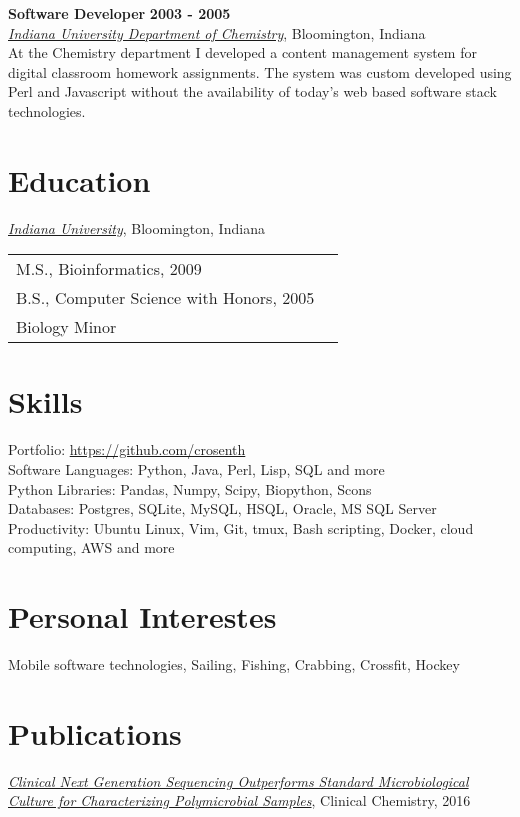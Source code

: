 \documentclass{res}
\begin{document}
\begin{resume}
\textbf{Software Developer} \hfill \textbf{2003 - 2005}\\
\href{http://chem.indiana.edu/}{\textit{Indiana University Department of Chemistry}}, Bloomington, Indiana\\
  At the Chemistry department I developed a content management system for digital classroom homework assignments.
  The system was custom developed using Perl and Javascript without the availability of today's web based 
  software stack technologies.

\section{Education}
\href{http://www.iub.edu/}{\textit{Indiana University}}, Bloomington, Indiana\\
\begin{tabular}{p{10cm} l} 
M.S., Bioinformatics, 2009\\
B.S., Computer Science with Honors, 2005\\
Biology Minor
\end{tabular}

\section{Skills}
Portfolio: \url{https://github.com/crosenth}\\
Software Languages: Python, Java, Perl, Lisp, SQL and more\\
Python Libraries: Pandas, Numpy, Scipy, Biopython, Scons\\
Databases: Postgres, SQLite, MySQL, HSQL, Oracle, MS SQL Server\\
Productivity: Ubuntu Linux, Vim, Git, tmux, Bash scripting, Docker, cloud computing, AWS and more

\section{Personal Interestes}
Mobile software technologies, Sailing, Fishing, Crabbing, Crossfit, Hockey

\section{Publications}
\renewcommand{\section}[2]{}
\begin{thebibliography}{4}
    \href{http://clinchem.aaccjnls.org/content/62/11/1465}
         {\textit{Clinical Next Generation Sequencing Outperforms Standard 
                  Microbiological Culture for Characterizing 
                  Polymicrobial Samples}},
         Clinical Chemistry, 2016


\end{thebibliography}
\end{resume}
\end{document}
